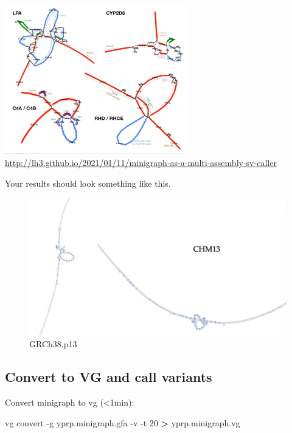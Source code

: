 \documentclass[
]{book}
\newenvironment{Shaded}{\begin{snugshade}}{\end{snugshade}}
\newcommand{\AttributeTok}[1]{\textcolor[rgb]{0.77,0.63,0.00}{#1}}
\newcommand{\ExtensionTok}[1]{#1}
\newcommand{\NormalTok}[1]{#1}
\newcommand{\OperatorTok}[1]{\textcolor[rgb]{0.81,0.36,0.00}{\textbf{#1}}}
\begin{document}
\includegraphics[width=0.6\textwidth,height=\textheight]{./Figures/LPA.png}
\url{http://lh3.github.io/2021/01/11/minigraph-as-a-multi-assembly-sv-caller}

Your results should look something like this.

\begin{figure}
\centering
\includegraphics[width=1\textwidth,height=\textheight]{./Figures/GRCh38.p13.png}
\caption{GRCh38.p13}
\end{figure}

\hypertarget{convert-to-vg-and-call-variants}{%
\subsection*{Convert to VG and call variants}\label{convert-to-vg-and-call-variants}}

Convert minigraph to vg (\textless1min):

\begin{Shaded}
\begin{Highlighting}[]
\ExtensionTok{vg}\NormalTok{ convert }\AttributeTok{{-}g}\NormalTok{ yprp.minigraph.gfa }\AttributeTok{{-}v} \AttributeTok{{-}t}\NormalTok{ 20 }\OperatorTok{\textgreater{}}\NormalTok{ yprp.minigraph.vg}
\end{Highlighting}
\end{Shaded}
\end{document}
